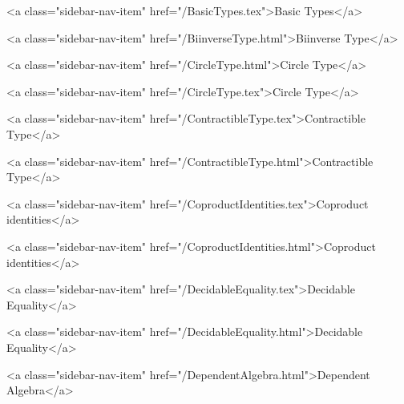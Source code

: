           <a class="sidebar-nav-item" href="/BasicTypes.tex">Basic Types</a>
        
      
    
      
        
          <a class="sidebar-nav-item" href="/BiinverseType.html">Biinverse Type</a>
        
      
    
      
        
          <a class="sidebar-nav-item" href="/CircleType.html">Circle Type</a>
        
      
    
      
        
          <a class="sidebar-nav-item" href="/CircleType.tex">Circle Type</a>
        
      
    
      
        
          <a class="sidebar-nav-item" href="/ContractibleType.tex">Contractible Type</a>
        
      
    
      
        
          <a class="sidebar-nav-item" href="/ContractibleType.html">Contractible Type</a>
        
      
    
      
        
          <a class="sidebar-nav-item" href="/CoproductIdentities.tex">Coproduct identities</a>
        
      
    
      
        
          <a class="sidebar-nav-item" href="/CoproductIdentities.html">Coproduct identities</a>
        
      
    
      
        
          <a class="sidebar-nav-item" href="/DecidableEquality.tex">Decidable Equality</a>
        
      
    
      
        
          <a class="sidebar-nav-item" href="/DecidableEquality.html">Decidable Equality</a>
        
      
    
      
        
          <a class="sidebar-nav-item" href="/DependentAlgebra.html">Dependent Algebra</a>
        
      
    
